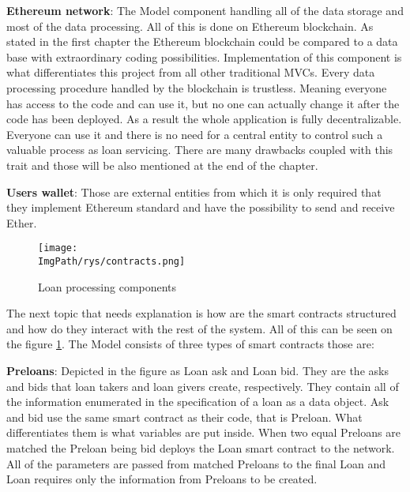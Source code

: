 \documentclass[a4paper,12pt,twoside,openany]{report}
\newcommand{\ImgPath}{.}
\begin{document}
\textbf{Ethereum network}: The Model component handling all of the data storage and most of the data processing. All of this is done on Ethereum blockchain. As stated in the first chapter the Ethereum blockchain could be compared to a data base with extraordinary coding possibilities. Implementation of this component is what differentiates this project from all other traditional MVCs. Every data processing procedure handled by the blockchain is trustless. Meaning everyone has access to the code and can use it, but no one can actually change it after the code has been deployed. As a result the whole application is fully decentralizable. Everyone can use it and there is no need for a central entity to control such a valuable process as loan servicing. There are many drawbacks coupled with this trait and those will be also mentioned at the end of the chapter.

\textbf{Users wallet}: Those are external entities from which it is only required that they implement Ethereum standard and have the possibility to send and receive Ether.

\begin{figure}[!htbp]
	\begin{center}
\centering
\texttt{[image: \\ImgPath/rys/contracts.png]}
\end{center}
	\caption{Loan processing components}
	\label{loan components}
\end{figure}

The next topic that needs explanation is how are the smart contracts structured and how do they interact with the rest of the system. All of this can be seen on the figure \ref{loan components}. The Model consists of three types of smart contracts those are:

\textbf{Preloans}: Depicted in the figure as Loan ask and Loan bid. They are the asks and bids that loan takers and loan givers create, respectively. They contain all of the information enumerated in the specification of a loan as a data object. Ask and bid use the same smart contract as their code, that is Preloan. What differentiates them is what variables are put inside. When two equal Preloans are matched the Preloan being bid deploys the Loan smart contract to the network. All of the parameters are passed from matched Preloans to the final Loan and Loan requires only the information from Preloans to be created. 
\end{document}
